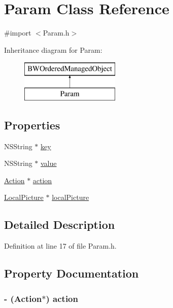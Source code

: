 \hypertarget{interface_param}{
\section{Param Class Reference}
\label{interface_param}
}


{\ttfamily \#import $<$Param.h$>$}

Inheritance diagram for Param:\begin{figure}[H]
\begin{center}
\leavevmode
\includegraphics[height=2.000000cm]{interface_param}
\end{center}
\end{figure}
\subsection*{Properties}
\begin{DoxyCompactItemize}
\item 
NSString $\ast$ \hyperlink{interface_param_a0b6a9866e1390620790387442c1fb8be}{key}
\item 
NSString $\ast$ \hyperlink{interface_param_a450e6764e415b0f430eac319e099ba48}{value}
\item 
\hyperlink{interface_action}{Action} $\ast$ \hyperlink{interface_param_a7c5f73f165449bc45c02206611806395}{action}
\item 
\hyperlink{interface_local_picture}{LocalPicture} $\ast$ \hyperlink{interface_param_a188b0e359426f49c922be3306c54e028}{localPicture}
\end{DoxyCompactItemize}


\subsection{Detailed Description}


Definition at line 17 of file Param.h.



\subsection{Property Documentation}
\hypertarget{interface_param_a7c5f73f165449bc45c02206611806395}{
\subsubsection[{action}]{\setlength{\rightskip}{0pt plus 5cm}-\/ ({\bf Action}$\ast$) action}}
\label{interface_param_a7c5f73f165449bc45c02206611806395}


